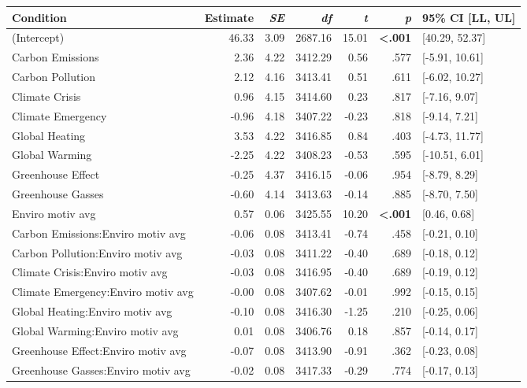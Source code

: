\begin{table}[ht]
\centering
\begin{tabular}{lrrrrrl}
  \hline
Condition & Estimate & \textit{SE} & \textit{df} & \textit{t} & \textit{p} & 95\% CI [LL, UL] \\ 
  \hline
(Intercept) & 46.33 & 3.09 & 2687.16 & 15.01 & \textbf{\textless  .001} & [40.29, 52.37] \\ 
  Carbon Emissions & 2.36 & 4.22 & 3412.29 & 0.56 & .577 & [-5.91, 10.61] \\ 
  Carbon Pollution & 2.12 & 4.16 & 3413.41 & 0.51 & .611 & [-6.02, 10.27] \\ 
  Climate Crisis & 0.96 & 4.15 & 3414.60 & 0.23 & .817 & [-7.16, 9.07] \\ 
  Climate Emergency & -0.96 & 4.18 & 3407.22 & -0.23 & .818 & [-9.14, 7.21] \\ 
  Global Heating & 3.53 & 4.22 & 3416.85 & 0.84 & .403 & [-4.73, 11.77] \\ 
  Global Warming & -2.25 & 4.22 & 3408.23 & -0.53 & .595 & [-10.51, 6.01] \\ 
  Greenhouse Effect & -0.25 & 4.37 & 3416.15 & -0.06 & .954 & [-8.79, 8.29] \\ 
  Greenhouse Gasses & -0.60 & 4.14 & 3413.63 & -0.14 & .885 & [-8.70, 7.50] \\ 
  Enviro motiv avg & 0.57 & 0.06 & 3425.55 & 10.20 & \textbf{\textless  .001} & [0.46, 0.68] \\ 
  Carbon Emissions:Enviro motiv avg & -0.06 & 0.08 & 3413.41 & -0.74 & .458 & [-0.21, 0.10] \\ 
  Carbon Pollution:Enviro motiv avg & -0.03 & 0.08 & 3411.22 & -0.40 & .689 & [-0.18, 0.12] \\ 
  Climate Crisis:Enviro motiv avg & -0.03 & 0.08 & 3416.95 & -0.40 & .689 & [-0.19, 0.12] \\ 
  Climate Emergency:Enviro motiv avg & -0.00 & 0.08 & 3407.62 & -0.01 & .992 & [-0.15, 0.15] \\ 
  Global Heating:Enviro motiv avg & -0.10 & 0.08 & 3416.30 & -1.25 & .210 & [-0.25, 0.06] \\ 
  Global Warming:Enviro motiv avg & 0.01 & 0.08 & 3406.76 & 0.18 & .857 & [-0.14, 0.17] \\ 
  Greenhouse Effect:Enviro motiv avg & -0.07 & 0.08 & 3413.90 & -0.91 & .362 & [-0.23, 0.08] \\ 
  Greenhouse Gasses:Enviro motiv avg & -0.02 & 0.08 & 3417.33 & -0.29 & .774 & [-0.17, 0.13] \\ 
   \hline
\end{tabular}
\end{table}
